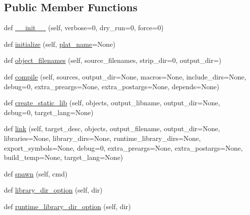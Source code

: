 \subsection*{Public Member Functions}
\begin{DoxyCompactItemize}
\item 
def \hyperlink{classsetuptools_1_1__distutils_1_1__msvccompiler_1_1MSVCCompiler_ac362b58d9e902be15fae67a3df106a27}{\+\_\+\+\_\+init\+\_\+\+\_\+} (self, verbose=0, dry\+\_\+run=0, force=0)
\item 
def \hyperlink{classsetuptools_1_1__distutils_1_1__msvccompiler_1_1MSVCCompiler_aa2349a0545de444b11f59503d6bc44d3}{initialize} (self, \hyperlink{classsetuptools_1_1__distutils_1_1__msvccompiler_1_1MSVCCompiler_a0635efc0a414a2deacea80c680e314c9}{plat\+\_\+name}=None)
\item 
def \hyperlink{classsetuptools_1_1__distutils_1_1__msvccompiler_1_1MSVCCompiler_af93e8224d8a5efd8ae1ef5c1528029a5}{object\+\_\+filenames} (self, source\+\_\+filenames, strip\+\_\+dir=0, output\+\_\+dir=\textquotesingle{}\textquotesingle{})
\item 
def \hyperlink{classsetuptools_1_1__distutils_1_1__msvccompiler_1_1MSVCCompiler_ac642fa6ac2fb8e00686189cecfff2ca6}{compile} (self, sources, output\+\_\+dir=None, macros=None, include\+\_\+dirs=None, debug=0, extra\+\_\+preargs=None, extra\+\_\+postargs=None, depends=None)
\item 
def \hyperlink{classsetuptools_1_1__distutils_1_1__msvccompiler_1_1MSVCCompiler_a2fa7642d2486732907523f795803b56b}{create\+\_\+static\+\_\+lib} (self, objects, output\+\_\+libname, output\+\_\+dir=None, debug=0, target\+\_\+lang=None)
\item 
def \hyperlink{classsetuptools_1_1__distutils_1_1__msvccompiler_1_1MSVCCompiler_a2ab58f74fe6ed70b7108a72bddd96218}{link} (self, target\+\_\+desc, objects, output\+\_\+filename, output\+\_\+dir=None, libraries=None, library\+\_\+dirs=None, runtime\+\_\+library\+\_\+dirs=None, export\+\_\+symbols=None, debug=0, extra\+\_\+preargs=None, extra\+\_\+postargs=None, build\+\_\+temp=None, target\+\_\+lang=None)
\item 
def \hyperlink{classsetuptools_1_1__distutils_1_1__msvccompiler_1_1MSVCCompiler_ad864d93a2de2cf761b709fac1a62f26d}{spawn} (self, cmd)
\item 
def \hyperlink{classsetuptools_1_1__distutils_1_1__msvccompiler_1_1MSVCCompiler_a6330022c4413bd69d7d19bb45dfc4c63}{library\+\_\+dir\+\_\+option} (self, dir)
\item 
def \hyperlink{classsetuptools_1_1__distutils_1_1__msvccompiler_1_1MSVCCompiler_ac25f94397152f824860fce72d5430b6c}{runtime\+\_\+library\+\_\+dir\+\_\+option} (self, dir)

\end{DoxyCompactItemize}
